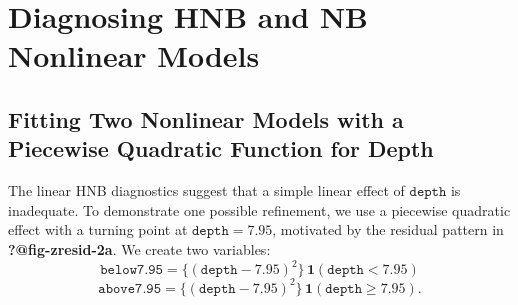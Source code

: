 \documentclass[
  english,
  letterpaper,
  DIV=11,
  numbers=noendperiod]{scrartcl}
\begin{document}
\section{Diagnosing HNB and NB Nonlinear
Models}\label{diagnosing-hnb-and-nb-nonlinear-models}

\subsection{Fitting Two Nonlinear Models with a Piecewise Quadratic
Function for
Depth}\label{fitting-two-nonlinear-models-with-a-piecewise-quadratic-function-for-depth}

The linear HNB diagnostics suggest that a simple linear effect of
\(\texttt{depth}\) is inadequate. To demonstrate one possible
refinement, we use a piecewise quadratic effect with a turning point at
\(\texttt{depth}=7.95\), motivated by the residual pattern in
\textbf{?@fig-zresid-2a}. We create two variables:
\[\texttt{below7.95} = \{(\texttt{depth}-7.95)^2\}\,\mathbf{1}(\texttt{depth}<7.95)\]
\[\texttt{above7.95} = \{(\texttt{depth}-7.95)^2\}\,\mathbf{1}(\texttt{depth}\ge 7.95).\]
\end{document}

